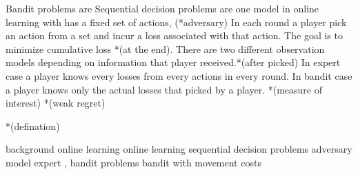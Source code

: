 \justify

Bandit problems are Sequential decision problems are one model in online learning with has a fixed set of actions, 
(*adversary)
In each round a player pick an action from a set and incur a loss associated with that action.
The goal is to minimize cumulative loss *(at the end).
There are two different observation models depending on information that player received.*(after picked)
In expert case a player knows every losses from every actions in every round.
In bandit case a player knows only the actual losses that picked by a player.
*(measure of interest)
*(weak regret)

*(defination)

background online learning
online learning
sequential decision problems
adversary model
expert , bandit problems
bandit with movement costs